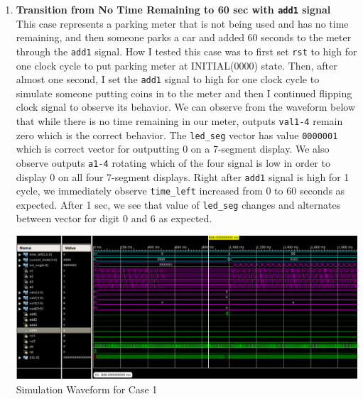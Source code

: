 \documentclass{article}
\begin{document}
\begin{enumerate}
    \item \textbf{Transition from No Time Remaining to 60 sec with \texttt{add1} signal} \\
    This case represents a parking meter that is not being used and has no time remaining, and then someone parks a car and added 60 seconds to the meter through the \texttt{add1} signal. How I tested this case was to first set \texttt{rst} to high for one clock cycle to put parking meter at INITIAL(0000) state. Then, after almost one second, I set the \texttt{add1} signal to high for one clock cycle to simulate someone putting coins in to the meter and then I continued flipping clock signal to observe its behavior. We can observe from the waveform below that while there is no time remaining in our meter, outputs \texttt{val1-4} remain zero which is the correct behavior. The \texttt{led\_seg} vector has value \texttt{0000001} which is correct vector for outputting 0 on a 7-segment display. We also observe outputs \texttt{a1-4} rotating which of the four signal is low in order to display 0 on all four 7-segment displays. Right after \texttt{add1} signal is high for 1 cycle, we immediately observe \texttt{time\_left} increased from 0 to 60 seconds as expected. After 1 sec, we see that value of \texttt{led\_seg} changes and alternates between vector for digit 0 and 6 as expected. 
    \begin{center}
        \includegraphics[scale=0.36]{waveform-1.png} \\
        \caption{Simulation Waveform for Case 1}
    \end{center}
    \par
    

\end{enumerate}
\end{document}
